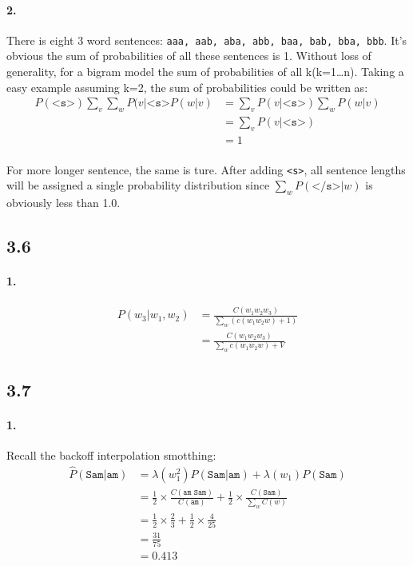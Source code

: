 \documentclass{article}
\begin{document}
\paragraph{2.}
There is eight 3 word sentences: \texttt{aaa, aab, aba, abb, baa, bab, bba, bbb}.
It's obvious the sum of probabilities of all these sentences is 1.
Without loss of generality, for a bigram model the sum of probabilities of all k(k=1\dots n).
Taking a easy example assuming k=2, the sum of probabilities could be written as:
\begin{align*}
    P(\texttt{<s>})\sum_v \sum_w P(v|\texttt{<s>} P(w|v) & = \sum_v P(v|\texttt{<s>}) \sum_w P(w|v) \\
                                                         & = \sum_v P(v|\texttt{<s>})               \\
                                                         & = 1
\end{align*}
\paragraph{}
For more longer sentence, the same is ture. After adding \texttt{<s>}, all sentence lengths will be assigned
a single probability distribution since $\sum_w P(\texttt{</s>}|w)$ is obviously less than 1.0.

\subsection*{3.6}
\paragraph{1.}
\begin{align*}
    P(w_3|w_1, w_2) & = \frac{C(w_1 w_2 w_3)}{\sum_w (c(w_1 w_2 w) + 1)} \\
                    & =  \frac{C(w_1 w_2 w_3)}{\sum_w c(w_1 w_2 w) + V}
\end{align*}

\subsection*{3.7}
\paragraph{1.}
Recall the backoff interpolation smotthing:
\begin{align*}
    \hat{P}(\texttt{Sam|am}) & = \lambda(w_1^2)P(\texttt{Sam|am}) + \lambda(w_1)P(\texttt{Sam})   \\
                             & = \frac{1}{2} \times \frac{C(\texttt{am Sam})}{C(\texttt{am})}
    + \frac{1}{2} \times \frac{C(\texttt{Sam})}{\sum_w C(w)}                                      \\
                             & = \frac{1}{2} \times \frac{2}{3} + \frac{1}{2} \times \frac{4}{25} \\
                             & = \frac{31}{75}                                                    \\
                             & = 0.413
\end{align*}
\end{document}
